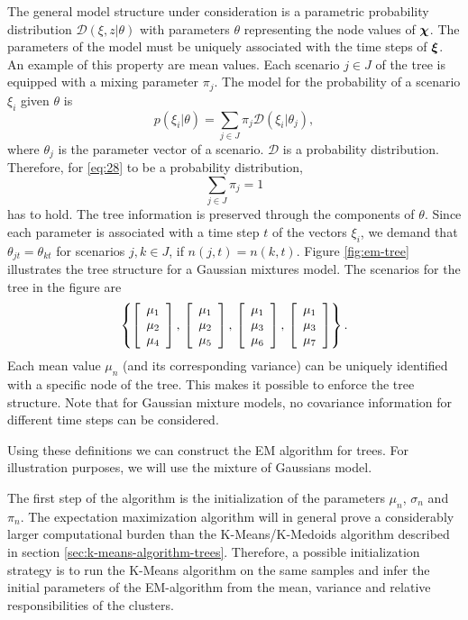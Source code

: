 The general model structure under consideration is a parametric probability distribution $\mathcal{D}(\xi,z|\theta)$ with parameters $\theta$ representing the node values of $\boldsymbol\chi$.
The parameters of the model must be uniquely associated with the time steps of $\boldsymbol\xi$.
An example of this property are mean values.
Each scenario $j\in J$ of the tree is equipped with a mixing parameter $\pi_j$.
The model for the probability of a scenario $\xi_i$ given $\theta$ is
\begin{equation}
  \label{eq:28}
  p(\xi_i|\theta) = \sum_{j\in J}\pi_j\mathcal{D}(\xi_i|\theta_j),
\end{equation}
where $\theta_j$ is the parameter vector of a scenario.
$\mathcal{D}$ is a probability distribution.
Therefore, for \eqref{eq:28} to be a probability distribution,
\begin{equation}
  \label{eq:30}
  \sum_{j\in J}\pi_j = 1
\end{equation}
has to hold.
The tree information is preserved through the components of $\theta$.
Since each parameter is associated with a time step $t$ of the vectors $\xi_i$, we demand that $\theta_{jt}=\theta_{kt}$ for scenarios $j,k\in J$, if $n(j,t)=n(k,t)$.
Figure \ref{fig:em-tree} illustrates the tree structure for a Gaussian mixtures model.
The scenarios for the tree in the figure are
\[
\left\{\left[\begin{array}{c} \mu_1\\\mu_2\\\mu_4 \end{array}\right],\,\left[\begin{array}{c} \mu_1\\\mu_2\\\mu_5 \end{array}\right],\,\left[\begin{array}{c} \mu_1\\\mu_3\\\mu_6 \end{array}\right],\,\left[\begin{array}{c} \mu_1\\\mu_3\\\mu_7 \end{array}\right]\right\}.
\]
Each mean value $\mu_n$ (and its corresponding variance) can be uniquely identified with a specific node of the tree.
This makes it possible to enforce the tree structure.
Note that for Gaussian mixture models, no covariance information for different time steps can be considered.

Using these definitions we can construct the EM algorithm for trees.
For illustration purposes, we will use the mixture of Gaussians model.

The first step of the algorithm is the initialization of the parameters $\mu_n$, $\sigma_n$ and $\pi_n$.
The expectation maximization algorithm will in general prove a considerably larger computational burden than the K-Means/K-Medoids algorithm described in section \ref{sec:k-means-algorithm-trees}.
Therefore, a possible initialization strategy is to run the K-Means algorithm on the same samples and infer the initial parameters of the EM-algorithm from the mean, variance and relative responsibilities of the clusters.

